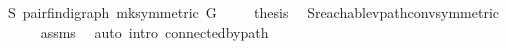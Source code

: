 \begin{isabellebody}
\ S{\isacharcolon}\ pair{\isacharunderscore}fin{\isacharunderscore}digraph\ {\isachardoublequoteopen}mk{\isacharunderscore}symmetric\ G{\isachardoublequoteclose}\ \isacommand{{\isachardot}{\isachardot}}\isamarkupfalse%
\isanewline
\ \ \isamarkupfalse%
\ {\isachardoublequoteopen}{\isacharquery}thesis{\isachardoublequoteclose}\ \isamarkupfalse%
\ S{\isachardot}reachable{\isacharunderscore}vpath{\isacharunderscore}conv{\isacharbrackleft}symmetric{\isacharbrackright}\isanewline
\ \ \ \ \isamarkupfalse%
\ assms\ \isamarkupfalse%
\ {\isacharparenleft}auto\ intro{\isacharcolon}\ connected{\isacharunderscore}by{\isacharunderscore}path{\isacharparenright}\isanewline
{}\isamarkupfalse%
%
\endisatagproof
{\isafoldproof}%
%
\isadelimproof
\isanewline
%
\endisadelimproof
%
\isadelimtheory
\isanewline
%
\endisadelimtheory
%
\isatagtheory
{}\isamarkupfalse%
%
\endisatagtheory
{\isafoldtheory}%
%
\isadelimtheory
%
\endisadelimtheory
\end{isabellebody}%
